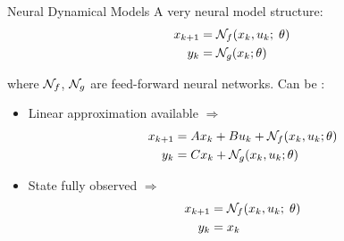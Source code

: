 \documentclass{beamer}
\begin{document}
\begin{frame}{Neural Dynamical Models}{}
A very  neural model structure:
\begin{align*}
 x_{k+1} &= \mathcal{N}_f(x_k, u_k;\;\theta)\\
    y_k  &= \mathcal{N}_g(x_k; \theta)
\end{align*}

where $\mathcal{N}_f$, $\mathcal{N}_g$ are feed-forward neural networks.
Can be  :
\pause 
\begin{itemize}
 \item Linear approximation available $\Rightarrow$
\begin{equation*}
\begin{split}
 x_{k+1} &= A x_k + B u_k + \mathcal{N}_f(x_{k}, u_{k}; \theta)\\
 y_k     &= C x_k + \mathcal{N}_g(x_{k}, u_{k}; \theta)
 \end{split}
\end{equation*}
 \pause
  \item State fully observed $\Rightarrow$ %
\begin{align*}
 x_{k+1} &= \mathcal{N}_f(x_k, u_k;\;\theta)\\
    y_k  &= x_k
\end{align*}

 \end{itemize}
\end{frame}
\end{document}
